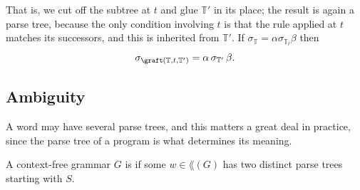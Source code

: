 That is, we cut off the subtree at $t$ and glue $\mathbb T'$ in its place; the result is again a parse tree, because the only condition involving $t$ is that the rule applied at $t$ matches its successors, and this is inherited from $\mathbb T'$. If $\sigma_{\mathbb T} = \alpha\sigma_{\mathbb T_t}\beta$ then
$$\sigma_{\graft(\mathbb T, t, \mathbb T')} = \alpha\, \sigma_{\mathbb T'}\, \beta.$$

\subsection{Ambiguity}

A word may have several parse trees, and this matters a great deal in practice, since the parse tree of a program is what determines its meaning.

\begin{definition}
	A context-free grammar $G$ is  if some $w \in \lang(G)$ has two distinct parse trees starting with $S$.
\end{definition}

